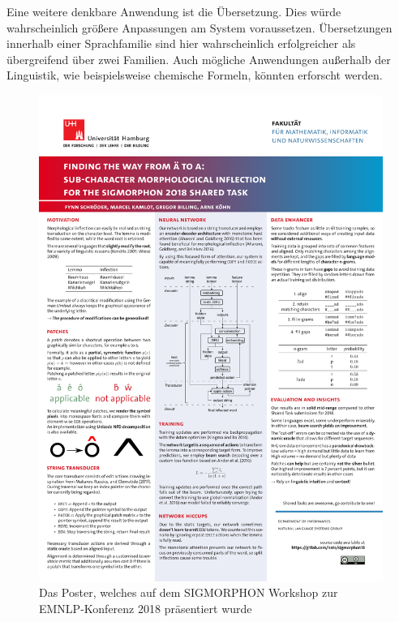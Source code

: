 \documentclass[11pt,a4paper]{article}
\begin{document}
Eine weitere denkbare Anwendung ist die Übersetzung. Dies würde wahrscheinlich größere Anpassungen am System voraussetzen. Übersetzungen innerhalb einer Sprachfamilie sind hier wahrscheinlich erfolgreicher als übergreifend über zwei Familien. Auch mögliche Anwendungen außerhalb der Linguistik, wie beispielsweise chemische Formeln, könnten erforscht werden.




\appendix
\begin{figure}
	\centering
	\includegraphics[width=\textwidth]{poster-emnlp.pdf}
	\caption{Das Poster, welches auf dem SIGMORPHON Workshop zur EMNLP-Konferenz 2018 präsentiert wurde}
	\label{app:poster}
\end{figure}
\end{document}
